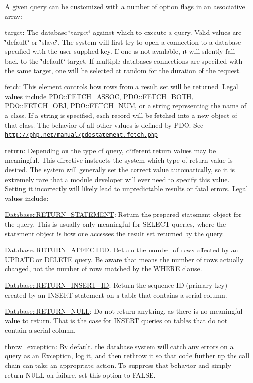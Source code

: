 A given query can be customized with a number of option flags in an associative array:
\begin{DoxyItemize}
\item target: The database \char`\"{}target\char`\"{} against which to execute a query. Valid values are \char`\"{}default\char`\"{} or \char`\"{}slave\char`\"{}. The system will first try to open a connection to a database specified with the user-\/supplied key. If one is not available, it will silently fall back to the \char`\"{}default\char`\"{} target. If multiple databases connections are specified with the same target, one will be selected at random for the duration of the request.
\item fetch: This element controls how rows from a result set will be returned. Legal values include PDO::FETCH\_\-ASSOC, PDO::FETCH\_\-BOTH, PDO::FETCH\_\-OBJ, PDO::FETCH\_\-NUM, or a string representing the name of a class. If a string is specified, each record will be fetched into a new object of that class. The behavior of all other values is defined by PDO. See \href{http://php.net/manual/pdostatement.fetch.php}{\tt http://php.net/manual/pdostatement.fetch.php}
\item return: Depending on the type of query, different return values may be meaningful. This directive instructs the system which type of return value is desired. The system will generally set the correct value automatically, so it is extremely rare that a module developer will ever need to specify this value. Setting it incorrectly will likely lead to unpredictable results or fatal errors. Legal values include:
\begin{DoxyItemize}
\item \hyperlink{classDatabase_a7b7c6f8f81159b97752412e439d957dc}{Database::RETURN\_\-STATEMENT}: Return the prepared statement object for the query. This is usually only meaningful for SELECT queries, where the statement object is how one accesses the result set returned by the query.
\item \hyperlink{classDatabase_a557879c7732a573ed395f9196afeb898}{Database::RETURN\_\-AFFECTED}: Return the number of rows affected by an UPDATE or DELETE query. Be aware that means the number of rows actually changed, not the number of rows matched by the WHERE clause.
\item \hyperlink{classDatabase_a56dab08fbf70f81aaf6f55a71922f4ef}{Database::RETURN\_\-INSERT\_\-ID}: Return the sequence ID (primary key) created by an INSERT statement on a table that contains a serial column.
\item \hyperlink{classDatabase_ae00484bf91c4447fc1b391408f7cfbd3}{Database::RETURN\_\-NULL}: Do not return anything, as there is no meaningful value to return. That is the case for INSERT queries on tables that do not contain a serial column.
\end{DoxyItemize}
\item throw\_\-exception: By default, the database system will catch any errors on a query as an \hyperlink{classException}{Exception}, log it, and then rethrow it so that code further up the call chain can take an appropriate action. To suppress that behavior and simply return NULL on failure, set this option to FALSE.
\end{DoxyItemize}

